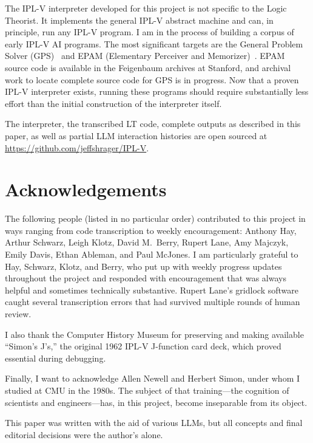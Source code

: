 \documentclass[journal]{IEEEtran}
\begin{document}
The IPL-V interpreter developed for this project is not specific to
the Logic Theorist. It implements the general IPL-V abstract machine
and can, in principle, run any IPL-V program. I am in the process of
building a corpus of early IPL-V AI programs. The most significant
targets are the General Problem Solver (GPS)~\cite{newell1959gps} and
EPAM (Elementary Perceiver and
Memorizer)~\cite{feigenbaum1961epam}. EPAM source code is available in
the Feigenbaum archives at Stanford, and archival work to locate
complete source code for GPS is in progress. Now that a proven IPL-V
interpreter exists, running these programs should require
substantially less effort than the initial construction of the
interpreter itself.

The interpreter, the transcribed LT code, complete outputs as
described in this paper, as well as partial LLM interaction histories
are open sourced at \url{https://github.com/jeffshrager/IPL-V}.

\section*{Acknowledgements}

The following people (listed in no particular order) contributed to
this project in ways ranging from code transcription to weekly
encouragement: Anthony Hay, Arthur Schwarz, Leigh Klotz, David
M.\ Berry, Rupert Lane, Amy Majczyk, Emily Davis, Ethan Ableman, and
Paul McJones. I am particularly grateful to Hay, Schwarz, Klotz, and
Berry, who put up with weekly progress updates throughout the project
and responded with encouragement that was always helpful and sometimes
technically substantive. Rupert Lane's gridlock software caught
several transcription errors that had survived multiple rounds of
human review.

I also thank the Computer History Museum for preserving and making
available ``Simon's J's,'' the original 1962 IPL-V J-function card
deck, which proved essential during debugging.

Finally, I want to acknowledge Allen Newell and Herbert Simon, under
whom I studied at CMU in the 1980s. The subject of that
training---the cognition of scientists and engineers---has, in this
project, become inseparable from its object.

{\footnotesize This paper was written with the aid of various LLMs, but all concepts
and final editorial decisions were the author's alone.}
\end{document}
